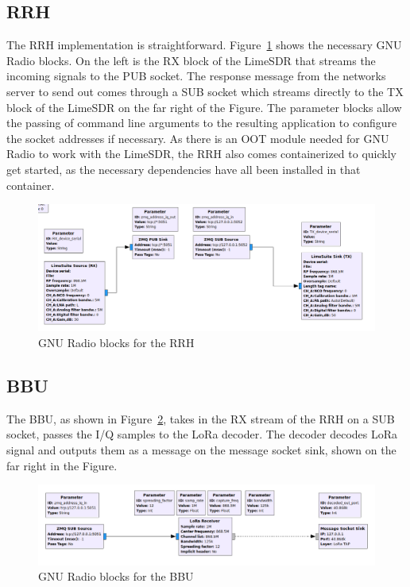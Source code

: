 \subsection{RRH}
The RRH implementation is straightforward. Figure~\ref{fig:RRH_impl} shows the necessary 
GNU Radio blocks. On the left is the RX block of the LimeSDR that streams the incoming signals to the 
PUB socket. The response message from the networks server to send out comes through a SUB socket which 
streams directly to the TX block of the LimeSDR on the far right of the Figure.
The parameter blocks allow the passing of command line arguments to the resulting application to configure
the socket addresses if necessary. As there is an OOT module needed for GNU Radio to work with the LimeSDR, the 
RRH also comes containerized to quickly get started, as the necessary dependencies have all been installed
in that container.
\begin{figure}[h]
    \centering
    \includegraphics[width=1\textwidth]{figures/RRH_impl.png}
    \caption{GNU Radio blocks for the RRH}
    \label{fig:RRH_impl}
\end{figure}

\subsection{BBU}
The BBU, as shown in Figure~\ref{fig:BBU_impl}, takes in the RX stream of the RRH on a SUB socket,
passes the I/Q samples to the LoRa decoder. The decoder decodes LoRa signal and outputs them as a 
message on the message socket sink, shown on the far right in the Figure.


\begin{figure}[h]
    \centering
    \includegraphics[width=1\textwidth]{figures/BBU_impl.png}
    \caption{GNU Radio blocks for the BBU}
    \label{fig:BBU_impl}
\end{figure}

